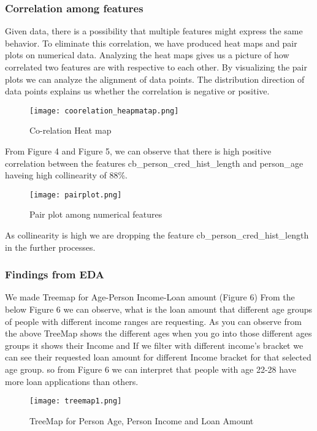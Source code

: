 \documentclass[12pt]{article}
\begin{document}
\subsubsection{Correlation among features}

Given data, there is a possibility that multiple features might express the same behavior. To eliminate this correlation, we have produced heat maps and pair plots on numerical data. Analyzing the heat maps gives us a picture of how correlated two features are with respective to each other. By visualizing the pair plots we can analyze the alignment of data points. The distribution direction of data points explains us whether the correlation is negative or positive.

\begin{figure}[h] %
\centering
\texttt{[image: coorelation\_heapmatap.png]}
\caption{Co-relation Heat map}
\end{figure}

From Figure 4 and Figure 5, we can observe that there is high positive correlation between the features cb\_person\_cred\_hist\_length and person\_age haveing high collinearity of 88\%. 

\begin{figure}[h] %
\centering
\texttt{[image: pairplot.png]}
\caption{Pair plot among numerical features}
\end{figure}
As collinearity is high we are dropping the feature cb\_person\_cred\_hist\_length in the further processes.


\subsubsection{Findings from EDA}


We made Treemap for Age-Person Income-Loan amount (Figure 6)
From the below Figure 6 we can observe, what is the loan amount that different age groups of people with different income ranges are requesting.
As you can observe from the above TreeMap shows the different ages when you go into those different ages groups it shows their Income and If we filter with different income's bracket we can see their requested loan amount for different Income bracket for that selected age group.
so from Figure 6 we can interpret that people with age 22-28 have more loan applications than others.
\begin{figure}[!h] %
\centering
\texttt{[image: treemap1.png]}
\caption{TreeMap for Person Age, Person Income and Loan Amount}
\end{figure}
\end{document}
